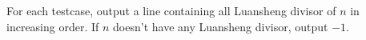 For each testcase, output a line containing all Luansheng divisor of $n$ in increasing order.  
If $n$ doesn't have any Luansheng divisor, output $-1$. 
